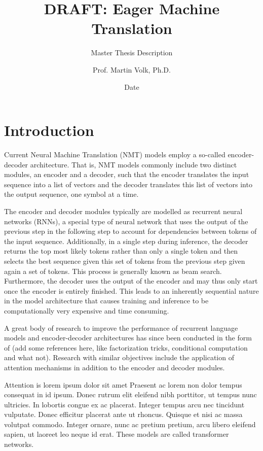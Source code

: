 \documentclass[english]{uzhpub}
\begin{document}
\title{DRAFT: Eager Machine Translation}

\subtitle{Master Thesis Description}

\author{Prof. Martin Volk, Ph.D.}

\date{Date}

\maketitle


\section{Introduction}

Current Neural Machine Translation (NMT) models employ a so-called encoder-decoder architecture. That is, NMT models commonly include two distinct modules, an encoder and a decoder, such that the encoder translates the input sequence into a list of vectors and the decoder translates this list of vectors into the output sequence, one symbol at a time.

The encoder and decoder modules typically are modelled as recurrent neural networks (RNNs), a special type of neural network that uses the output of the previous step in the following step to account for dependencies between tokens of the input sequence.
Additionally, in a single step during inference, the decoder returns the top most likely tokens rather than only a single token and then selects the best sequence given this set of tokens from the previous step given again a set of tokens.
This process is generally known as beam search.
Furthermore, the decoder uses the output of the encoder and may thus only start once the encoder is entirely finished. This leads to an inherently sequential nature in the model architecture that causes training and inference to be computationally very expensive and time consuming. \cite{attentionisallyouneed,hochreiter1997long,chung2014empirical}

A great body of research to improve the performance of recurrent language models and encoder-decoder architectures has since been conducted in the form of (add some references here, like factorization tricks, conditional computation and what not).
Research with similar objectives include the application of attention mechanisms in addition to the encoder and decoder modules.

Attention is lorem ipsum dolor sit amet Praesent ac lorem non dolor tempus consequat in id ipsum. Donec rutrum elit eleifend nibh porttitor, ut tempus nunc ultricies. In lobortis congue ex ac placerat. Integer tempus arcu nec tincidunt vulputate. Donec efficitur placerat ante ut rhoncus. Quisque et nisi ac massa volutpat commodo. Integer ornare, nunc ac pretium pretium, arcu libero eleifend sapien, ut laoreet leo neque id erat. These models are called transformer networks.
\end{document}
